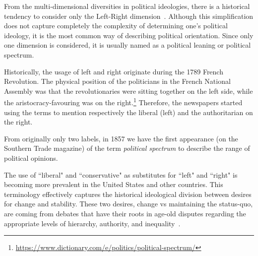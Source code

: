From the multi-dimensional diversities in political ideologies, there is a historical tendency to consider only the Left-Right dimension~\citep{jost2009political}.
Although this simplification does not capture completely the complexity of determining one's political ideology, it is the most common way of describing political orientation.
Since only one dimension is considered, it is usually named as a political leaning or political spectrum.


Historically, the usage of left and right originate during the 1789 French Revolution. The physical position of the politicians in the French National Assembly was that the revolutionaries were sitting together on the left side, while the aristocracy-favouring was on the right.\footnote{\url{https://www.dictionary.com/e/politics/political-spectrum/}}
Therefore, the newspapers started using the terms to mention respectively the liberal (left) and the authoritarian on the right.

From originally only two labels, in 1857 we have the first appearance (on the Southern Trade magazine) of the term \emph{political spectrum} to describe the range of political opinions.


The use of ``liberal" and ``conservative" as substitutes for ``left" and ``right" is becoming more prevalent in the United States and other countries.
This terminology effectively captures the historical ideological division between desires for change and stability.
These two desires, change vs maintaining the status-quo, are coming from debates that have their roots in age-old disputes regarding the appropriate levels of hierarchy, authority, and inequality~\citep{bobbio1996left}.


